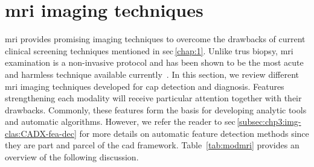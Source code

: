 \section{\acs*{mri} imaging techniques}\label{sec:chp2:imaging}

\ac{mri} provides promising imaging techniques to overcome the drawbacks of current clinical screening techniques mentioned in \acs{sec}\,\ref{chap:1}.
Unlike \ac{trus} biopsy, \ac{mri} examination is a non-invasive protocol and has been shown to be the most acute and harmless technique available currently~\cite{Turkbey2012}.
In this section, we review different \ac{mri} imaging techniques developed for \ac{cap} detection and diagnosis.
Features strengthening each modality will receive particular attention together with their drawbacks.
Commonly, these features form the basis for developing analytic tools and automatic algorithms.
However, we refer the reader to \acs{sec}\,\ref{subsec:chp3:img-clas:CADX-fea-dec} for more details on automatic feature detection methods since they are part and parcel of the \acs{cad} framework.
Table~\ref{tab:modmri} provides an overview of the following discussion.



